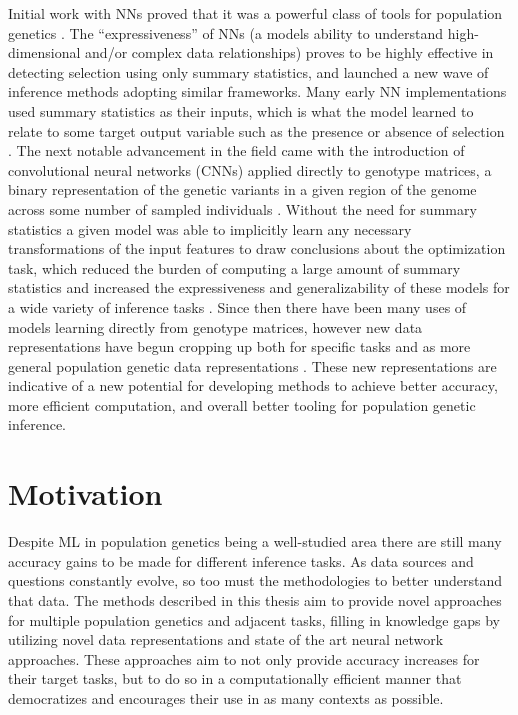Initial work with NNs proved that it was a powerful class of tools for population genetics \cite{sheehanDeepLearningPopulation2016}. The “expressiveness” of NNs (a models ability to understand high-dimensional and/or complex data relationships) proves to be highly effective in detecting selection using only summary statistics, and launched a new wave of inference methods adopting similar frameworks. Many early NN implementations used summary statistics as their inputs, which is what the model learned to relate to some target output variable such as the presence or absence of selection \cite{schriderHICRobustIdentification2016}. The next notable advancement in the field came with the introduction of convolutional neural networks (CNNs) \cite{lecunBackpropagationAppliedHandwritten1989} applied directly to genotype matrices, a binary representation of the genetic variants in a given region of the genome across some number of sampled individuals \cite{flagelUnreasonableEffectivenessConvolutional2019}. Without the need for summary statistics a given model was able to implicitly learn any necessary transformations of the input features to draw conclusions about the optimization task, which reduced the burden of computing a large amount of summary statistics and increased the expressiveness and generalizability of these models for a wide variety of inference tasks . Since then there have been many uses of models learning directly from genotype matrices, however new data representations have begun cropping up both for specific tasks and as more general population genetic data representations \cite{GenomeWideInferenceAncestral, kelleherEfficientCoalescentSimulation2016}. These new representations are indicative of a new potential for developing methods to achieve better accuracy, more efficient computation, and overall better tooling for population genetic inference.

\section{Motivation}

Despite ML in population genetics being a well-studied area there are still many accuracy gains to be made for different inference tasks. As data sources and questions constantly evolve, so too must the methodologies to better understand that data. The methods described in this thesis aim to provide novel approaches for multiple population genetics and adjacent tasks, filling in knowledge gaps by utilizing novel data representations and state of the art neural network approaches. These approaches aim to not only provide accuracy increases for their target tasks, but to do so in a computationally efficient manner that democratizes and encourages their use in as many contexts as possible.

